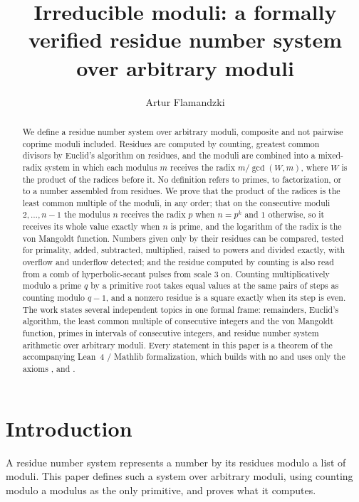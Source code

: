 \documentclass[11pt]{amsart}
\title{Irreducible moduli: a formally verified residue number system over arbitrary moduli}
\author{Artur Flamandzki}
\date{}
\newcommand{\lean}[1]{\texttt{\detokenize{#1}}}
\theoremstyle{definition}
\begin{document}
\begin{abstract}
We define a residue number system over arbitrary moduli, composite and not pairwise coprime
moduli included. Residues are computed by counting, greatest common divisors by Euclid's
algorithm on residues, and the moduli are combined into a mixed-radix system in which each
modulus $m$ receives the radix $m / \gcd(W, m)$, where $W$ is the product of the radices before
it. No definition refers to primes, to factorization, or to a number assembled from residues.
We prove that the product of the radices is the least common multiple of the moduli, in any
order; that on the consecutive moduli $2, \dots, n-1$ the modulus $n$ receives the radix $p$ when
$n = p^k$ and $1$ otherwise, so it receives its whole value exactly when $n$ is prime, and the
logarithm of the radix is the von Mangoldt function. Numbers given only by their residues can
be compared, tested for primality, added, subtracted, multiplied, raised to powers and divided
exactly, with overflow and underflow detected; and the residue computed by counting is also
read from a comb of hyperbolic-secant pulses from scale $3$ on. Counting multiplicatively
modulo a prime $q$ by a primitive root takes equal values at the same pairs of steps as
counting modulo $q - 1$, and a nonzero residue is a square exactly when its step is even. The
work states several independent topics in one formal frame: remainders, Euclid's algorithm, the least common
multiple of consecutive integers and the von Mangoldt function, primes in intervals of
consecutive integers, and residue number system arithmetic over arbitrary moduli. Every
statement in this paper is a theorem of the accompanying Lean~4 / Mathlib formalization, which
builds with no \lean{sorry} and uses only the axioms \lean{propext}, \lean{Quot.sound} and
\lean{Classical.choice}.
\end{abstract}

\maketitle

\section{Introduction}

A residue number system represents a number by its residues modulo a list of moduli. This
paper defines such a system over arbitrary moduli, using counting modulo a modulus as the only
primitive, and proves what it computes.
\end{document}
